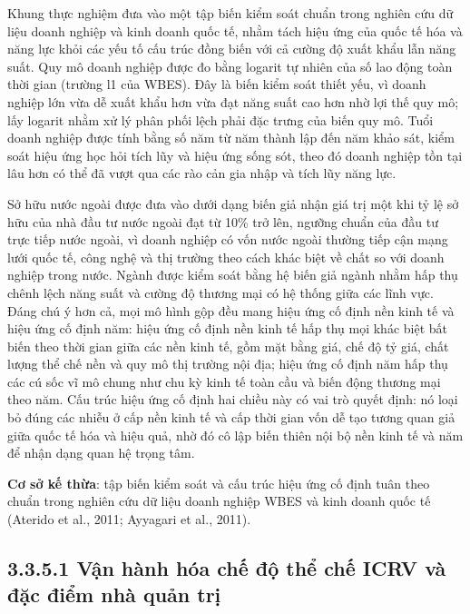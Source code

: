 \documentclass[
  a4paper,
  13pt]{extreport}
\begin{document}
Khung thực nghiệm đưa vào một tập biến kiểm soát chuẩn trong nghiên cứu
dữ liệu doanh nghiệp và kinh doanh quốc tế, nhằm tách hiệu ứng của quốc
tế hóa và năng lực khỏi các yếu tố cấu trúc đồng biến với cả cường độ
xuất khẩu lẫn năng suất. Quy mô doanh nghiệp được đo bằng logarit tự
nhiên của số lao động toàn thời gian (trường l1 của WBES). Đây là biến
kiểm soát thiết yếu, vì doanh nghiệp lớn vừa dễ xuất khẩu hơn vừa đạt
năng suất cao hơn nhờ lợi thế quy mô; lấy logarit nhằm xử lý phân phối
lệch phải đặc trưng của biến quy mô. Tuổi doanh nghiệp được tính bằng số
năm từ năm thành lập đến năm khảo sát, kiểm soát hiệu ứng học hỏi tích
lũy và hiệu ứng sống sót, theo đó doanh nghiệp tồn tại lâu hơn có thể đã
vượt qua các rào cản gia nhập và tích lũy năng lực.

Sở hữu nước ngoài được đưa vào dưới dạng biến giả nhận giá trị một khi
tỷ lệ sở hữu của nhà đầu tư nước ngoài đạt từ 10\% trở lên, ngưỡng chuẩn
của đầu tư trực tiếp nước ngoài, vì doanh nghiệp có vốn nước ngoài
thường tiếp cận mạng lưới quốc tế, công nghệ và thị trường theo cách
khác biệt về chất so với doanh nghiệp trong nước. Ngành được kiểm soát
bằng hệ biến giả ngành nhằm hấp thụ chênh lệch năng suất và cường độ
thương mại có hệ thống giữa các lĩnh vực. Đáng chú ý hơn cả, mọi mô hình
gộp đều mang hiệu ứng cố định nền kinh tế và hiệu ứng cố định năm: hiệu
ứng cố định nền kinh tế hấp thụ mọi khác biệt bất biến theo thời gian
giữa các nền kinh tế, gồm mặt bằng giá, chế độ tỷ giá, chất lượng thể
chế nền và quy mô thị trường nội địa; hiệu ứng cố định năm hấp thụ các
cú sốc vĩ mô chung như chu kỳ kinh tế toàn cầu và biến động thương mại
theo năm. Cấu trúc hiệu ứng cố định hai chiều này có vai trò quyết định:
nó loại bỏ đúng các nhiễu ở cấp nền kinh tế và cấp thời gian vốn dễ tạo
tương quan giả giữa quốc tế hóa và hiệu quả, nhờ đó cô lập biến thiên
nội bộ nền kinh tế và năm để nhận dạng quan hệ trọng tâm.

\textbf{Cơ sở kế thừa}: tập biến kiểm soát và cấu trúc hiệu ứng cố định
tuân theo chuẩn trong nghiên cứu dữ liệu doanh nghiệp WBES và kinh doanh
quốc tế (Aterido et al., 2011; Ayyagari et al., 2011).

\hypertarget{vux1eadn-huxe0nh-huxf3a-chux1ebf-ux111ux1ed9-thux1ec3-chux1ebf-icrv-vuxe0-ux111ux1eb7c-ux111iux1ec3m-nhuxe0-quux1ea3n-trux1ecb}{%
\subsection{3.3.5.1 Vận hành hóa chế độ thể chế ICRV và đặc điểm nhà
quản
trị}\label{vux1eadn-huxe0nh-huxf3a-chux1ebf-ux111ux1ed9-thux1ec3-chux1ebf-icrv-vuxe0-ux111ux1eb7c-ux111iux1ec3m-nhuxe0-quux1ea3n-trux1ecb}}
\end{document}
